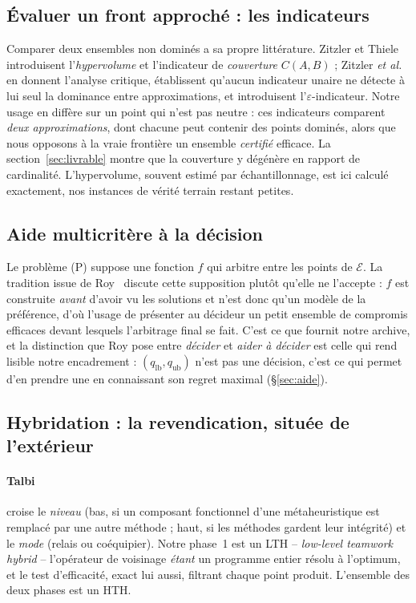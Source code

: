 \documentclass[11pt,a4paper]{article}
\theoremstyle{plain}
\theoremstyle{remark}
\newcommand{\Ecal}{\mathcal{E}}
\begin{document}
\subsection{Évaluer un front approché : les indicateurs}
\label{sec:revueind}

Comparer deux ensembles non dominés a sa propre littérature. Zitzler et
Thiele~\cite{zitzler1999} introduisent l'\emph{hypervolume} et l'indicateur
de \emph{couverture} $C(A,B)$ ; Zitzler \emph{et
al.}~\cite{zitzler2003} en donnent l'analyse critique, établissent qu'aucun
indicateur unaire ne détecte à lui seul la dominance entre approximations,
et introduisent l'$\varepsilon$-indicateur. Notre usage en diffère sur un
point qui n'est pas neutre : ces indicateurs comparent \emph{deux
approximations}, dont chacune peut contenir des points dominés, alors que
nous opposons à la vraie frontière un ensemble \emph{certifié} efficace. La
section~\ref{sec:livrable} montre que la couverture y dégénère en rapport de
cardinalité. L'hypervolume, souvent estimé par échantillonnage, est ici
calculé exactement, nos instances de vérité terrain restant petites.

\subsection{Aide multicritère à la décision}
\label{sec:revueaide}

Le problème (P) suppose une fonction $f$ qui arbitre entre les points de
$\Ecal$. La tradition issue de Roy~\cite{roy1985} discute cette supposition
plutôt qu'elle ne l'accepte : $f$ est construite \emph{avant} d'avoir vu les
solutions et n'est donc qu'un modèle de la préférence, d'où l'usage de
présenter au décideur un petit ensemble de compromis efficaces devant
lesquels l'arbitrage final se fait. C'est ce que fournit notre archive, et la
distinction que Roy pose entre \emph{décider} et \emph{aider à décider} est
celle qui rend lisible notre encadrement : $(q_{\text{lb}},q_{\text{ub}})$
n'est pas une décision, c'est ce qui permet d'en prendre une en connaissant
son regret maximal (\S\ref{sec:aide}).

\subsection{Hybridation : la revendication, située de l'extérieur}
\label{sec:taxonomie}

\paragraph{Talbi~\cite{talbi2002}} croise le \emph{niveau} (bas, si un
composant fonctionnel d'une métaheuristique est remplacé par une autre
méthode ; haut, si les méthodes gardent leur intégrité) et le \emph{mode}
(relais ou coéquipier). Notre phase~1 est un \textsf{LTH} -- \emph{low-level
teamwork hybrid} -- l'opérateur de voisinage \emph{étant} un programme
entier résolu à l'optimum, et le test d'efficacité, exact lui aussi,
filtrant chaque point produit. L'ensemble des deux phases est un
\textsf{HTH}.
\end{document}
